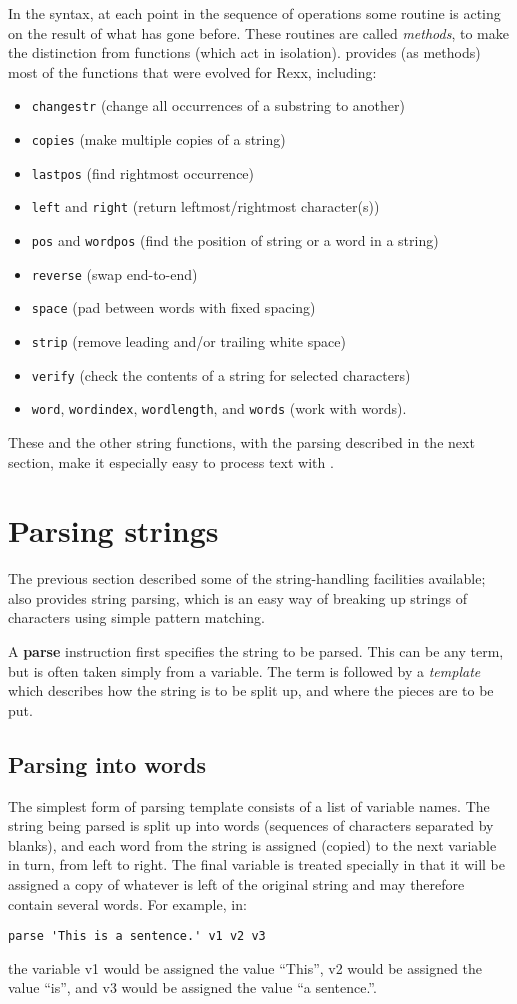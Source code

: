 In the \nr{} syntax, at each point in the sequence of operations
some routine is acting on the result of what has gone before. These
routines are called \emph{methods}, to make the distinction from functions
(which act in isolation). \nr{} provides (as methods) most of the
functions that were evolved for Rexx, including:
\begin{itemize}
\item \texttt{changestr} (change all occurrences of a substring to another)
\item \texttt{copies} (make multiple copies of a string)
\item \texttt{lastpos} (find rightmost occurrence)
\item \texttt{left} and \texttt{right} (return leftmost/rightmost character(s))
\item \texttt{pos} and \texttt{wordpos} (find the position of string or a word in a string)
\item \texttt{reverse} (swap end-to-end)
\item \texttt{space} (pad between words with fixed spacing)
\item \texttt{strip} (remove leading and/or trailing white space)
\item \texttt{verify} (check the contents of a string for selected characters)
\item \texttt{word}, \texttt{wordindex}, \texttt{wordlength}, and \texttt{words} (work with words).
\end{itemize}
These and the other string functions, with the parsing described in the next section, make it especially easy to process text with \nr{}.
\section{Parsing strings}
The previous section described some of the string-handling facilities
available; \nr{} also provides string parsing, which is an easy way
of breaking up strings of characters using simple pattern matching.

A \textbf{parse} instruction first specifies the string to be parsed. This can be any term, but is often taken simply from a variable. The term is followed by a \emph{template} which describes how the string is to be split up, and where the pieces are to be put.
\subsection{Parsing into words}
The simplest form of parsing template consists of a list of variable
names. The string being parsed is split up into words (sequences of
characters separated by blanks), and each word from the string is
assigned (copied) to the next variable in turn, from left to
right. The final variable is treated specially in that it will be
assigned a copy of whatever is left of the original string and may
therefore contain several words. For example, in:
\begin{lstlisting}[label=parsingstrings,caption=Parsing Strings]
parse 'This is a sentence.' v1 v2 v3
\end{lstlisting}
the variable v1 would be assigned the value “This”, v2 would be assigned the value
“is”, and v3 would be assigned the value “a sentence.”.

